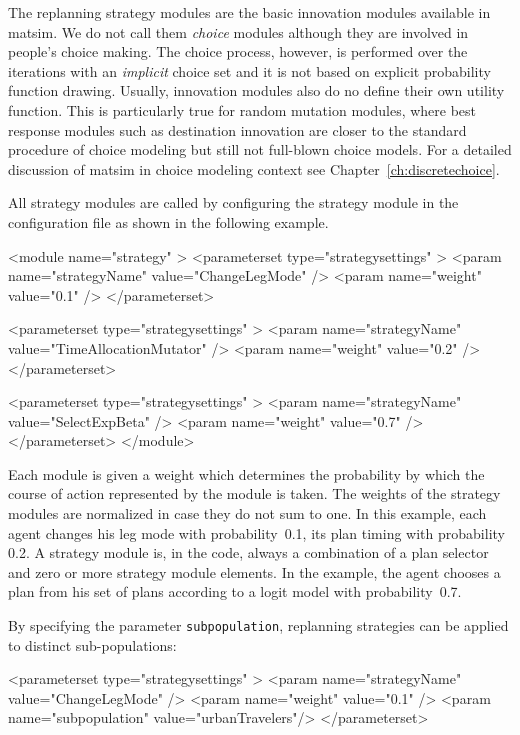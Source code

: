 
The replanning strategy modules are the basic innovation modules available in \gls{matsim}. We do not call them \emph{choice} modules although they are involved in people's choice making. The choice process, however, is performed over the iterations with an \emph{implicit} choice set and it is not based on explicit probability function drawing. Usually, innovation modules also do no define their own utility function. This is particularly true for random mutation modules, where best response modules such as destination innovation are closer to the standard procedure of choice modeling but still not full-blown choice models. For a detailed discussion of \gls{matsim} in choice modeling context see Chapter~\ref{ch:discretechoice}.

All strategy modules are called by configuring the strategy module in the configuration file as shown in the following example.
%
\begin{xml}
<module name="strategy" >
	<parameterset type="strategysettings" >
		<param name="strategyName" value="ChangeLegMode" />
		<param name="weight" value="0.1" />
	</parameterset>
	
	<parameterset type="strategysettings" >
		<param name="strategyName" value="TimeAllocationMutator" />
		<param name="weight" value="0.2" />
	</parameterset>
	
	<parameterset type="strategysettings" >
		<param name="strategyName" value="SelectExpBeta" />
		<param name="weight" value="0.7" />
	</parameterset>
</module>
\end{xml}
%
Each module is given a weight which determines the probability by which the course of action represented by the module is taken. The weights of the strategy modules are normalized in case they do not sum to one. In this example, each agent changes his leg mode with probability~0.1, its plan timing with probability 0.2. A strategy module is, in the code, always a combination of a plan selector and zero or more strategy module elements. In the example, the agent chooses a plan from his set of plans according to a logit model with probability~0.7. 

By specifying the parameter \lstinline|subpopulation|, replanning strategies can be applied to distinct sub-populations: \eg
\begin{xml}
	<parameterset type="strategysettings" >
		<param name="strategyName" value="ChangeLegMode" />
		<param name="weight" value="0.1" />
		<param name="subpopulation" value="urbanTravelers"/>
	</parameterset>
\end{xml}

